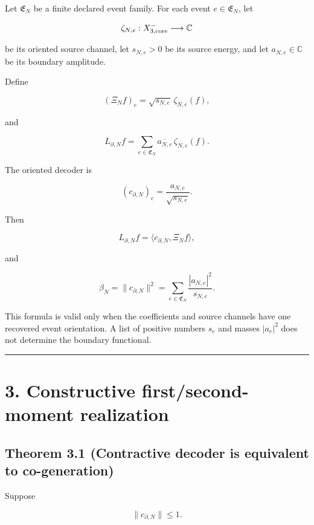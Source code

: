 Let \(\mathfrak E_N\) be a finite declared event family. For each event
\(e\in\mathfrak E_N\), let

\[
\zeta_{N,e}:X_{3,\rm core}^-\longrightarrow\mathbb C
\]

be its oriented source channel, let \(s_{N,e}>0\) be its source energy, and let
\(a_{N,e}\in\mathbb C\) be its boundary amplitude.

Define

\[
\boxed{
(\Xi_N f)_e
=\sqrt{s_{N,e}}\,\zeta_{N,e}(f),
}
\]

and

\[
\boxed{
L_{\partial,N}f
=\sum_{e\in\mathfrak E_N}
\overline{a_{N,e}}\,\zeta_{N,e}(f).
}
\]

The oriented decoder is

\[
\boxed{
(c_{\partial,N})_e
=\frac{a_{N,e}}{\sqrt{s_{N,e}}}.
}
\]

Then

\[
\boxed{
L_{\partial,N}f
=\langle c_{\partial,N},\Xi_N f\rangle,
}
\]

and

\[
\boxed{
\beta_N
=\|c_{\partial,N}\|^2
=\sum_{e\in\mathfrak E_N}
\frac{|a_{N,e}|^2}{s_{N,e}}.
}
\]

This formula is valid only when the coefficients and source channels have one
recovered event orientation. A list of positive numbers \(s_e\) and masses
\(|a_e|^2\) does not determine the boundary functional.

\begin{center}\rule{0.5\linewidth}{0.5pt}\end{center}

\hypertarget{constructive-firstsecond-moment-realization}{%
\section{3. Constructive first/second-moment realization}\label{constructive-firstsecond-moment-realization}}

\hypertarget{theorem-3.1-contractive-decoder-is-equivalent-to-co-generation}{%
\subsection{Theorem 3.1 (Contractive decoder is equivalent to co-generation)}\label{theorem-3.1-contractive-decoder-is-equivalent-to-co-generation}}

Suppose

\[
\|c_{\partial,N}\|\le1.
\]

